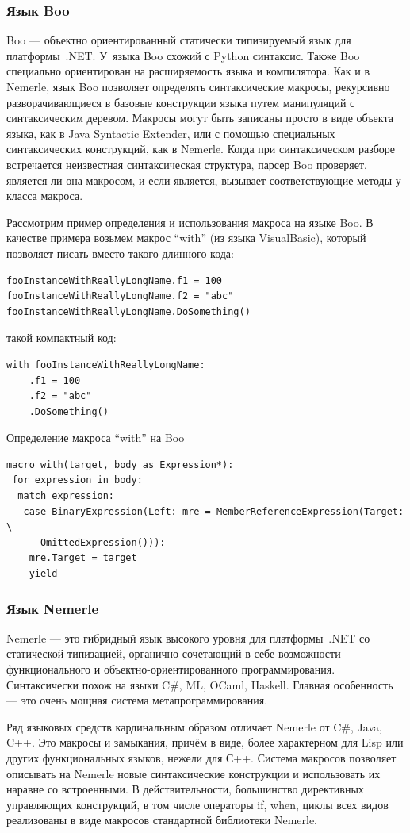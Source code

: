\documentclass[a4paper,12pt,titlepage]{extarticle}
\begin{document}
\subsubsection*{Язык Boo}
Boo --- объектно ориентированный статически типизируемый язык для платформы~.NET.
У~языка Boo схожий с Python синтаксис. Также Boo специально ориентирован на
расширяемость языка и компилятора. Как и в Nemerle, язык Boo позволяет
определять синтаксические макросы, рекурсивно разворачивающиеся в базовые
конструкции языка путем манипуляций с синтаксическим деревом. Макросы могут
быть записаны просто в виде объекта языка, как в Java Syntactic Extender, или с
помощью специальных синтаксических конструкций, как в Nemerle. Когда при
синтаксическом разборе встречается неизвестная синтаксическая структура, парсер
Boo проверяет, является ли она макросом, и если является, вызывает
соответствующие методы у класса макроса.

Рассмотрим пример определения и использования макроса на языке Boo. В качестве
примера возьмем макрос ``with'' (из языка VisualBasic), который позволяет писать
вместо такого длинного кода:
\begin{verbatim}
fooInstanceWithReallyLongName.f1 = 100
fooInstanceWithReallyLongName.f2 = "abc"
fooInstanceWithReallyLongName.DoSomething()
\end{verbatim}
такой компактный код:
\begin{verbatim}
with fooInstanceWithReallyLongName:
    .f1 = 100
    .f2 = "abc"
    .DoSomething()
\end{verbatim}
Определение макроса ``with'' на Boo
\begin{verbatim}
macro with(target, body as Expression*):
 for expression in body:
  match expression:
   case BinaryExpression(Left: mre = MemberReferenceExpression(Target: \ 
      OmittedExpression())):
    mre.Target = target
    yield
\end{verbatim}

\subsubsection*{Язык Nemerle}
Nemerle — это гибридный язык высокого уровня для платформы~.NET со статической
типизацией, органично сочетающий в себе возможности функционального и
объектно-ориентированного программирования. Синтаксически похож на языки C\#,
ML, OCaml, Haskell. Главная особенность --- это очень мощная система
метапрограммирования.

Ряд языковых средств кардинальным образом отличает Nemerle от C\#, Java, C++.
Это макросы и замыкания, причём в виде, более характерном для Lisp или других
функциональных языков, нежели для С++. Система макросов позволяет описывать на
Nemerle новые синтаксические конструкции и использовать их наравне со
встроенными. В действительности, большинство директивных управляющих
конструкций, в том числе операторы if, when, циклы всех видов реализованы в
виде макросов стандартной библиотеки Nemerle.
\end{document}
